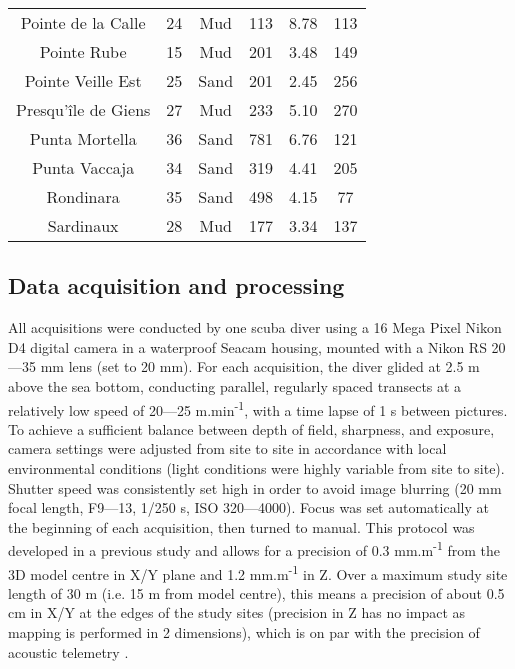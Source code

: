 \begin{table}[H]
\begin{tabular}{*{6}{c}}
        Pointe de la Calle & 24 & Mud & 113 & 8.78 & 113 \\
        Pointe Rube & 15 & Mud & 201 & 3.48 & 149 \\
        Pointe Veille Est & 25 & Sand & 201 & 2.45 & 256 \\
        Presqu’île de Giens & 27 & Mud & 233 & 5.10 & 270 \\
        Punta Mortella & 36 & Sand & 781 & 6.76 & 121 \\
        Punta Vaccaja & 34 & Sand & 319 & 4.41 & 205 \\
        Rondinara & 35 & Sand & 498 & 4.15 & 77 \\
        Sardinaux & 28 & Mud & 177 & 3.34 & 137 \\ \bottomrule
    \end{tabular}
\end{table}

\subsection{Data acquisition and processing}
All acquisitions were conducted by one scuba diver using a 16 Mega Pixel Nikon D4 digital camera in a waterproof Seacam housing, mounted with a Nikon RS 20---35 mm lens (set to 20 mm). For each acquisition, the diver glided at 2.5 m above the sea bottom, conducting parallel, regularly spaced transects at a relatively low speed of 20---25 m.min\textsuperscript{-1}, with a time lapse of 1 s between pictures. To achieve a sufficient balance between depth of field, sharpness, and exposure, camera settings were adjusted from site to site in accordance with local environmental conditions (light conditions were highly variable from site to site). Shutter speed was consistently set high in order to avoid image blurring (20 mm focal length, F9---13, 1/250 s, ISO 320---4000). Focus was set automatically at the beginning of each acquisition, then turned to manual. This protocol was developed in a previous study \citep{marre_monitoring_2019} and allows for a precision of 0.3 mm.m\textsuperscript{-1} from the 3D model centre in X/Y plane and 1.2 mm.m\textsuperscript{-1} in Z. Over a maximum study site length of 30 m (i.e. 15 m from model centre), this means a precision of about 0.5 cm in X/Y at the edges of the study sites (precision in Z has no impact as mapping is performed in 2 dimensions), which is on par with the precision of acoustic telemetry \citep{descamp_fast_2011}.

\newpage

